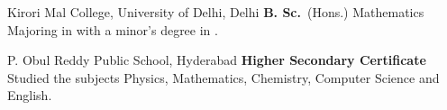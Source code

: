 {%
	Kirori Mal College, University of Delhi, Delhi}
{%
	\textbf{B. Sc.}~(Hons.) Mathematics}
{%
	Majoring in  with a minor's degree in .
}

{%
	P. Obul Reddy Public School, Hyderabad}
{%
	\textbf{Higher Secondary Certificate}~}
{%
	Studied the subjects Physics, Mathematics, Chemistry, Computer Science and English.}